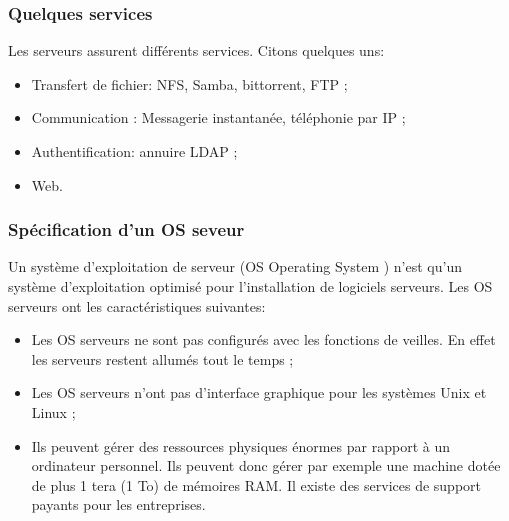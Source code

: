 \documentclass[a4paper,12pt,french]{report} %
\begin{document}
\subsubsection{Quelques services}
Les serveurs assurent différents services. Citons quelques uns:
\begin{itemize}
\item Transfert de fichier: NFS, Samba, bittorrent, FTP ;
\item Communication : Messagerie instantanée, téléphonie par IP ;
\item Authentification: annuire LDAP ;
\item Web.
\end{itemize}

\subsubsection{Spécification d'un OS seveur}
	Un système d'exploitation de serveur (OS Operating System ) n'est qu'un système d'exploitation optimisé pour l'installation de logiciels serveurs. Les OS serveurs ont les caractéristiques suivantes:
\begin{itemize}
	\item Les OS serveurs ne sont pas configurés avec les fonctions de veilles. En effet les serveurs restent allumés tout le temps ;
	\item Les OS serveurs n'ont pas d'interface graphique pour les systèmes Unix et Linux ;
	\item Ils peuvent gérer des ressources physiques énormes par rapport à un ordinateur personnel. Ils peuvent donc gérer par exemple une machine dotée de plus 1 tera (1 To) de mémoires RAM. Il existe des services de support payants pour les entreprises.
\end{itemize} 
	
\end{document}

